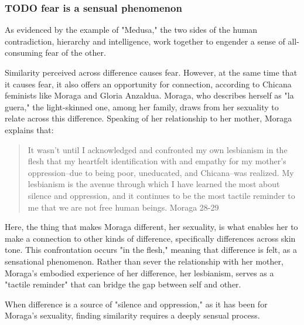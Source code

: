 \documentclass[11pt]{article}
\begin{document}
\subsubsection{{\bfseries\sffamily TODO} fear is a sensual phenomenon}
\label{sec:org48c4949}
As evidenced by the example of "Medusa," the two sides of the human
contradiction, hierarchy and intelligence, work together to engender a
sense of all-consuming fear of the other.

Similarity perceived across difference causes fear. However, at the
same time that it causes fear, it also offers an opportunity for
connection, according to Chicana feminists like Moraga and Gloria
Anzaldua. Moraga, who describes herself as "la guera," the
light-skinned one, among her family, draws from her sexuality to
relate across this difference. Speaking of her relationship to her
mother, Moraga explains that:
\begin{quote}
It wasn't until I acknowledged and confronted my own lesbianism in the
flesh that my heartfelt identification with and empathy for my
mother's oppression--due to being poor, uneducated, and Chicana--was
realized. My lesbianism is the avenue through which I have learned the
most about silence and oppression, and it continues to be the most
tactile reminder to me that we are not free human beings. Moraga 28-29
\end{quote}
Here, the thing that makes Moraga different, her sexuality, is what
enables her to make a connection to other kinds of difference,
specifically differences across skin tone. This confrontation occurs
"in the flesh," meaning that difference is felt, as a sensational
phenomenon. Rather than sever the relationship with her mother,
Moraga's embodied experience of her difference, her lesbianism, serves
as a "tactile reminder" that can bridge the gap between self and
other. 

When difference is a source of "silence and oppression," as it has
been for Moraga's sexuality, finding similarity requires a deeply
sensual process.
\end{document}
